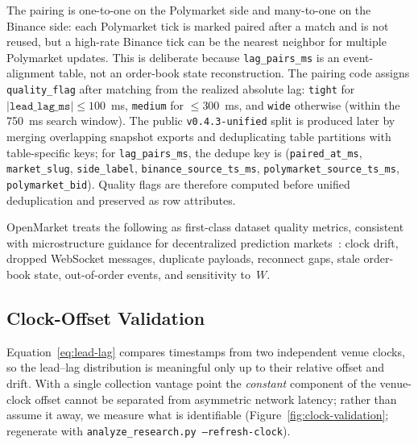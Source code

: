 The pairing is one-to-one on the Polymarket side and many-to-one on the Binance
side: each Polymarket tick is marked paired after a match and is not reused, but
a high-rate Binance tick can be the nearest neighbor for multiple Polymarket
updates. This is deliberate because \texttt{lag\_pairs\_ms} is an event-alignment
table, not an order-book state reconstruction. The pairing code assigns
\texttt{quality\_flag} after matching from the realized absolute lag:
\texttt{tight} for $|\texttt{lead\_lag\_ms}|\leq100$~ms, \texttt{medium} for
$\leq300$~ms, and \texttt{wide} otherwise (within the 750~ms search window).
The public \texttt{v0.4.3-unified} split is produced later by merging overlapping
snapshot exports and deduplicating table partitions with table-specific keys;
for \texttt{lag\_pairs\_ms}, the dedupe key is
(\texttt{paired\_at\_ms}, \texttt{market\_slug}, \texttt{side\_label},
\texttt{binance\_source\_ts\_ms}, \texttt{polymarket\_source\_ts\_ms},
\texttt{polymarket\_bid}). Quality flags are therefore computed before unified
deduplication and preserved as row attributes.

OpenMarket treats the following as first-class dataset quality metrics,
consistent with microstructure guidance for decentralized prediction
markets~\cite{dubach2026anatomy,rahman2025sok}:
clock drift, dropped WebSocket messages, duplicate payloads, reconnect gaps,
stale order-book state, out-of-order events, and sensitivity to~$W$.

\subsection{Clock-Offset Validation}
\label{sec:sync-clock}

Equation~\eqref{eq:lead-lag} compares timestamps from two independent venue
clocks, so the lead--lag distribution is meaningful only up to their relative
offset and drift. With a single collection vantage point the \emph{constant}
component of the venue-clock offset cannot be separated from asymmetric
network latency; rather than assume it away, we measure what is identifiable
(Figure~\ref{fig:clock-validation}; regenerate with
\texttt{analyze\_research.py --refresh-clock}).

